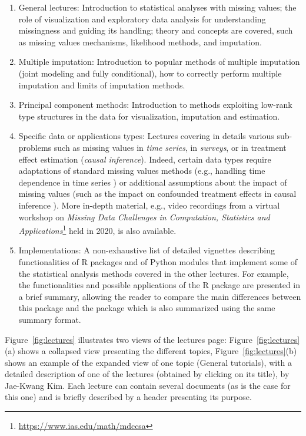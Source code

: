 \begin{enumerate}
\item General lectures: Introduction to statistical analyses with missing values; the role of visualization and exploratory data analysis for understanding missingness and guiding its handling; theory and concepts are covered, such as missing values mechanisms, likelihood methods, and  imputation.
\item Multiple imputation: Introduction to popular methods of multiple imputation (joint modeling and fully conditional), how to correctly perform multiple imputation and limits of imputation methods.
\item Principal component methods: Introduction to methods exploiting low-rank type structures in the data for
visualization, imputation and estimation.
\item Specific data or applications types: Lectures covering in details various sub-problems such as missing values in \textit{time series}, in \textit{surveys}, or in treatment effect estimation (\textit{causal inference}). Indeed, certain data types require adaptations of standard missing values methods (e.g., handling time dependence in time series \citep{moritz_2017}) or additional assumptions about the impact of missing values (such as the impact on confounded treatment effects in causal inference  \citep{Mayer2020}). More in-depth material, e.g., video recordings from a virtual workshop on \textit{Missing Data Challenges in Computation, Statistics and Applications}\footnote{\url{https://www.ias.edu/math/mdccsa}} held in 2020, is also available.
\item Implementations: A non-exhaustive list of detailed vignettes 
describing functionalities of {R} packages and of {Python} modules that implement some of the statistical 
analysis methods covered in the other lectures. For example, the functionalities and possible applications of the  {R} package are presented in a brief summary, allowing the reader to compare the main differences between this package and the  package which is also summarized using the same summary format.
\end{enumerate}

Figure~\ref{fig:lectures} illustrates two views of the lectures page: Figure~\ref{fig:lectures}(a) shows a collapsed view presenting the different topics, Figure~\ref{fig:lectures}(b) shows an example of the expanded view of one topic (General tutorials), with a
detailed description of one of the lectures (obtained by clicking on its title),
 by Jae-Kwang Kim. Each lecture can contain
several documents (as is the case for this one) and is briefly described by
a header presenting its purpose.

